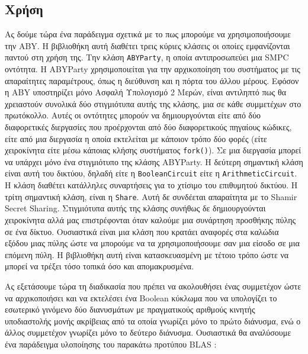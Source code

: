 \subsection{Χρήση}

Ας δούμε τώρα ένα παράδειγμα σχετικά με το πως μπορούμε να χρησιμοποιήσουμε την ABY. Η βιβλιοθήκη αυτή διαθέτει τρεις κύριες κλάσεις οι οποίες εμφανίζονται παντού στη χρήση της. Την κλάση \texttt{ABYParty}, η οποία αντιπροσωπεύει μια SMPC οντότητα. Η ABYParty χρησιμοποιείται για την αρχικοποίηση του συστήματος με τις απαραίτητες παραμέτρους, όπως η διεύθυνση και η πόρτα του άλλου μέρους. Εφόσον η ABY υποστηρίζει μόνο Ασφαλή Υπολογισμό 2 Μερών, είναι αντιληπτό πως θα χρειαστούν συνολικά δύο στιγμιότυπα αυτής της κλάσης, μια σε κάθε συμμετέχων στο πρωτόκολλο. Αυτές οι οντότητες μπορούν να δημιουργούνται είτε από δύο διαφορετικές διεργασίες που προέρχονται από δύο διαφορετικούς πηγαίους κώδικες, είτε από μια διεργασία η οποία εκτελείται με κάποιον τρόπο δύο φορές (είτε χειροκίνητα είτε μέσω κάποιας κλήσης συστήματος \texttt{fork()}). Σε μια διεργασία μπορεί να υπάρχει μόνο ένα στιγμιότυπο της κλάσης ABYParty. Η δεύτερη σημαντική κλάση είναι αυτή του δικτύου, δηλαδή είτε η \texttt{BooleanCircuit} είτε η \texttt{ArithmeticCircuit}. Η κλάση διαθέτει κατάλληλες συναρτήσεις για το χτίσιμο του επιθυμητού δικτύου. Η τρίτη σημαντική κλάση, είναι η \texttt{Share}. Αυτή δε συνδέεται απαραίτητα με το Shamir Secret Sharing. Στιγμιότυπα αυτής της κλάσης συνήθως δε δημιουργούνται χειροκίνητα αλλά μας επιστρέφονται όταν καλούμε μια συνάρτηση προσθήκης πύλης σε ένα δίκτυο. Ουσιαστικά είναι μια κλάση που κρατάει αναφορές στα καλώδια εξόδου μιας πύλης ώστε να μπορούμε να τα χρησιμοποιήσουμε σαν μια είσοδο σε μια επόμενη πύλη. Η βιβλιοθήκη αυτή είναι κατασκευασμένη με τέτοιο τρόπο ώστε να μπορεί να τρέξει τόσο τοπικά όσο και απομακρυσμένα.

Ας εξετάσουμε τώρα τη διαδικασία που πρέπει να ακολουθήσει ένας συμμετέχον ώστε να αρχικοποιήσει και να εκτελέσει ένα Boolean κύκλωμα που να υπολογίζει το εσωτερικό γινόμενο δύο διανυσμάτων με πραγματικούς αριθμούς κινητής υποδιαστολής μονής ακρίβειας από τα οποία γνωρίζει μόνο το πρώτο διάνυσμα, ενώ ο άλλος συμμετέχον γνωρίζει μόνο το δεύτερο διάνυσμα. Ουσιαστικά θα αναλύσουμε ένα παράδειγμα υλοποίησης του παρακάτω προτύπου BLAS :

\begin{figure}[h!]
    \begin{center}
        \inputminted[fontsize=\scriptsize,frame=single]{cpp}{./01_body/code/aby-example-step-0.cpp}
    \end{center}
\end{figure}

